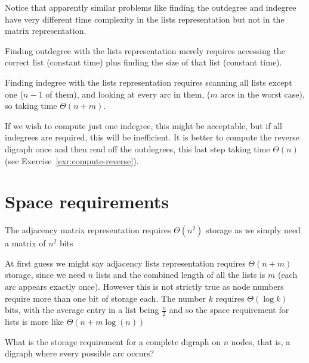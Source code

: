 Notice that apparently similar problems like finding the outdegree and indegree have very different time complexity in the lists representation but not in the matrix representation. 

Finding outdegree with the lists representation merely requires accessing
the correct list (constant time) plus finding the size of  that list
(constant time). 

Finding indegree with the  lists representation requires
scanning all lists except one ($n-1$ of them), and looking at every arc in
them, ($m$ arcs in the worst case), so taking time $\Theta(n+m)$. 


If we wish to compute just one indegree, this might be acceptable, but if all indegrees are required,
this will be inefficient. It is better to compute the reverse digraph once
and then read off the outdegrees, this last step taking time $\Theta(n)$ 
(see Exercise~\ref{exr:compute-reverse}).




\section{Space requirements}


The adjacency matrix
representation requires $\Theta(n^2)$ storage as we simply need a matrix of $n^2$
bits 

At first guess we might say adjacency lists representation requires
$\Theta(n+m)$ storage, since we need $n$ lists and the combined length of all the lists is $m$ (each arc appears exactly once).
However this is not strictly true as node numbers require more than one bit of storage each. The number $k$ requires  $\Theta(\log k)$ bits, with the average entry in a list being $\frac n 2$ and  so the space requirement for lists is more like $\Theta(n+m \log(n))$ 


\begin{Boxample}[2]
What is the storage requirement for a complete digraph on $n$ nodes, that is, a digraph where every possible arc
occurs?
\end{Boxample}

